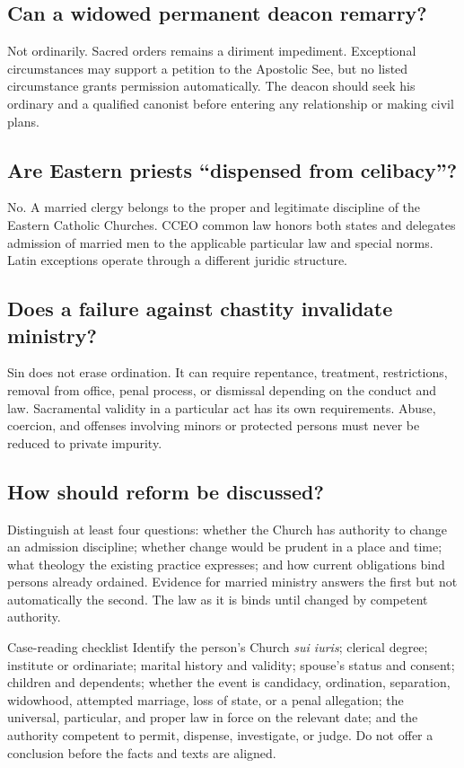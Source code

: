 \subsection{Can a widowed permanent deacon remarry?}

Not ordinarily. Sacred orders remains a diriment impediment. Exceptional circumstances may support a petition to the Apostolic See, but no listed circumstance grants permission automatically. The deacon should seek his ordinary and a qualified canonist before entering any relationship or making civil plans.

\subsection{Are Eastern priests ``dispensed from celibacy''?}

No. A married clergy belongs to the proper and legitimate discipline of the Eastern Catholic Churches. CCEO common law honors both states and delegates admission of married men to the applicable particular law and special norms. Latin exceptions operate through a different juridic structure.

\subsection{Does a failure against chastity invalidate ministry?}

Sin does not erase ordination. It can require repentance, treatment, restrictions, removal from office, penal process, or dismissal depending on the conduct and law. Sacramental validity in a particular act has its own requirements. Abuse, coercion, and offenses involving minors or protected persons must never be reduced to private impurity.

\subsection{How should reform be discussed?}

Distinguish at least four questions: whether the Church has authority to change an admission discipline; whether change would be prudent in a place and time; what theology the existing practice expresses; and how current obligations bind persons already ordained. Evidence for married ministry answers the first but not automatically the second. The law as it is binds until changed by competent authority.

\begin{studybox}{Case-reading checklist}
Identify the person's Church \emph{sui iuris}; clerical degree; institute or ordinariate; marital history and validity; spouse's status and consent; children and dependents; whether the event is candidacy, ordination, separation, widowhood, attempted marriage, loss of state, or a penal allegation; the universal, particular, and proper law in force on the relevant date; and the authority competent to permit, dispense, investigate, or judge. Do not offer a conclusion before the facts and texts are aligned.
\end{studybox}
